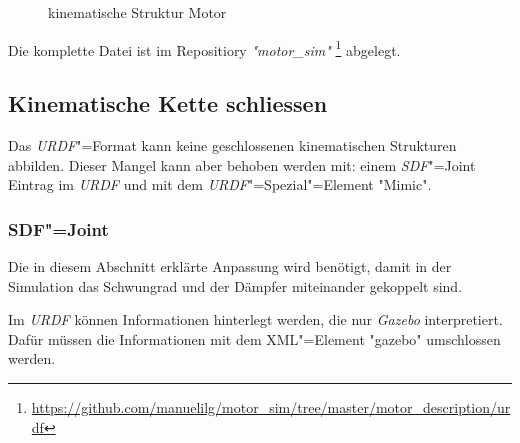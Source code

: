 \begin{figure}[ht!]
	\centering
{}
	\caption{kinematische Struktur Motor}
	\label{Ab:motor-struktur}
\end{figure}

Die komplette Datei ist im Repositiory \textit{\textsc{"}motor\_sim\textit{"}} \footnote{\url{https://github.com/manuelilg/motor_sim/tree/master/motor_description/urdf}} abgelegt.


\subsection{Kinematische Kette schliessen}
\label{chap:kin-schliessen}
Das \textit{URDF}"=Format kann keine geschlossenen kinematischen Strukturen abbilden.
Dieser Mangel kann aber behoben werden mit: einem \textit{SDF}"=Joint Eintrag im \textit{URDF} und mit dem \textit{URDF}"=Spezial"=Element \textsc{"}Mimic\textsc{"}.

\subsubsection{SDF"=Joint}
Die in diesem Abschnitt erklärte Anpassung wird benötigt, damit in der Simulation das Schwungrad und der Dämpfer miteinander gekoppelt sind.

Im \textit{URDF} können Informationen hinterlegt werden, die nur \textit{Gazebo} interpretiert.
Dafür müssen die Informationen mit dem XML"=Element \textsc{"}gazebo\textsc{"} umschlossen werden.


